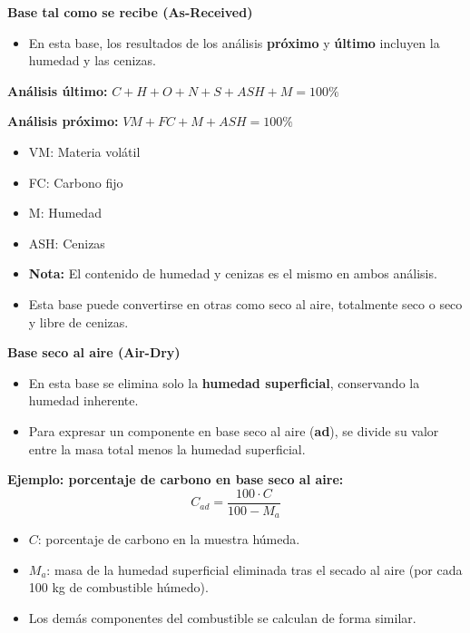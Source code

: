 \documentclass[../../main.tex]{subfiles}
\begin{document}
\begin{frame}{\textbf{Base tal como se recibe (As-Received)}}
\begin{itemize}
    \item En esta base, los resultados de los an\'alisis \textbf{pr\'oximo} y \textbf{\'ultimo} incluyen la humedad y las cenizas.
\end{itemize}

\textbf{An\'alisis \'ultimo:}
\(
C + H + O + N + S + ASH + M = 100\% 
\)

\textbf{An\'alisis pr\'oximo:}
\(
VM + FC + M + ASH = 100\% 
\)

\begin{itemize}
    \item VM: Materia vol\'atil
    \item FC: Carbono fijo
    \item M: Humedad
    \item ASH: Cenizas
\end{itemize}

\begin{itemize}
    \item \textbf{Nota:} El contenido de humedad y cenizas es el mismo en ambos an\'alisis.
    \item Esta base puede convertirse en otras como seco al aire, totalmente seco o seco y libre de cenizas.
\end{itemize}
\end{frame}

\begin{frame}{\textbf{Base seco al aire (Air-Dry)}}
\begin{itemize}
    \item En esta base se elimina solo la \textbf{humedad superficial}, conservando la humedad inherente.
    \item Para expresar un componente en base seco al aire (\textbf{ad}), se divide su valor entre la masa total menos la humedad superficial.
\end{itemize}

\textbf{Ejemplo: porcentaje de carbono en base seco al aire:}
\[
C_{ad} = \frac{100 \cdot C}{100 - M_a} 
\]

\begin{itemize}
    \item $C$: porcentaje de carbono en la muestra h\'umeda.
    \item $M_a$: masa de la humedad superficial eliminada tras el secado al aire (por cada 100 kg de combustible h\'umedo).
    \item Los dem\'as componentes del combustible se calculan de forma similar.
\end{itemize}
\end{frame}
\end{document}
